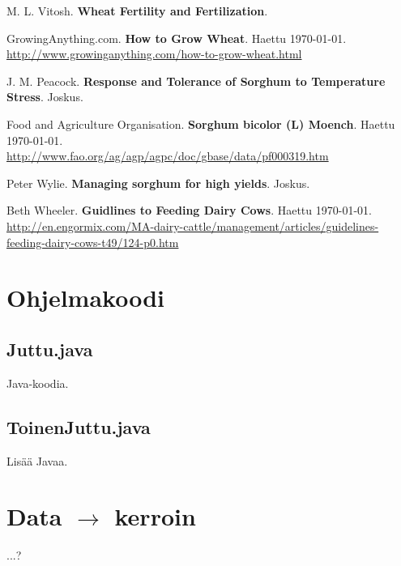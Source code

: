 \documentclass[12pt]{scrreprt}
\renewcommand\emph{\textbf}
\begin{document}
\begin{thebibliography}{9}
    M. L. Vitosh.
    \emph{Wheat Fertility and Fertilization}.

    GrowingAnything.com.
    \emph{How to Grow Wheat}.
    Haettu \today. \\
    \url{http://www.growinganything.com/how-to-grow-wheat.html}
        
    J. M. Peacock.
    \emph{Response and Tolerance of Sorghum to Temperature Stress}.
    Joskus.

    Food and Agriculture Organisation.
    \emph{Sorghum bicolor (L) Moench}.
    Haettu \today. \\
    \url{http://www.fao.org/ag/agp/agpc/doc/gbase/data/pf000319.htm}

    Peter Wylie.
    \emph{Managing sorghum for high yields}.
    Joskus.

    Beth Wheeler.
    \emph{Guidlines to Feeding Dairy Cows}.
    Haettu \today.
    \url{http://en.engormix.com/MA-dairy-cattle/management/articles/guidelines-feeding-dairy-cows-t49/124-p0.htm}

  \end{thebibliography}

  \begin{appendices}

  \chapter{Ohjelmakoodi}
  
  \section{Juttu.java}
  
  Java-koodia.
  
  \section{ToinenJuttu.java}

  Lisää Javaa.

  \chapter{Data $\rightarrow$ kerroin}
   
  ...?

  \end{appendices}
\end{document}
